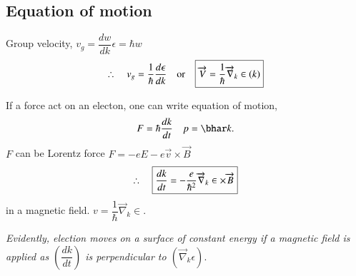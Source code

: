 \chapter{}\label{lec23}

\section*{Equation of motion}

Group velocity, $v_{g}=\dfrac{dw}{dk}$\quad $\epsilon=\hbar w$
$$
\therefore\quad v_{g}=\dfrac{1}{\hbar}\dfrac{d\epsilon}{dk}\quad \text{or}\quad \fbox{$\overrightarrow{V}=\dfrac{1}{\hbar}\overrightarrow{\nabla}_{k}\in (k)$}
$$

If a force act on an electon, one can write equation of motion,
$$
F=\hbar \dfrac{dk}{dt}\quad p=\bhar k.
$$
$F$ can be Lorentz force $F=-eE-e\overrightarrow{v}\times \overrightarrow{B}$
$$
\therefore\quad \fbox{$\dfrac{dk}{dt}=-\dfrac{e}{\hbar^{2}}\overrightarrow{\nabla}_{k}\in \times \overrightarrow{B}$}
$$
in a magnetic field. $v=\dfrac{1}{\hbar}\overrightarrow{\nabla}_{k}\in$.

{\em Evidently, election moves on a surface of constant energy if a magnetic field is applied as $\left(\dfrac{dk}{dt}\right)$ is perpendicular to $(\overrightarrow{\nabla}_{k}\epsilon)$}.

